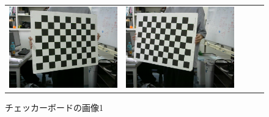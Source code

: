 \documentclass[]{jarticle}          %
\begin{document}
\begin{figure}[!ht]
\begin{center}
\begin{tabular}{ccccc}
      \includegraphics[keepaspectratio, scale=0.1]{figures/carib/camera1/9.png}&
      \includegraphics[keepaspectratio, scale=0.1]{figures/carib/camera1/10.png}\\
    \end{tabular}
  \end{center}
  \caption{チェッカーボードの画像1}
  \label{one}
\end{figure}
\end{document}
